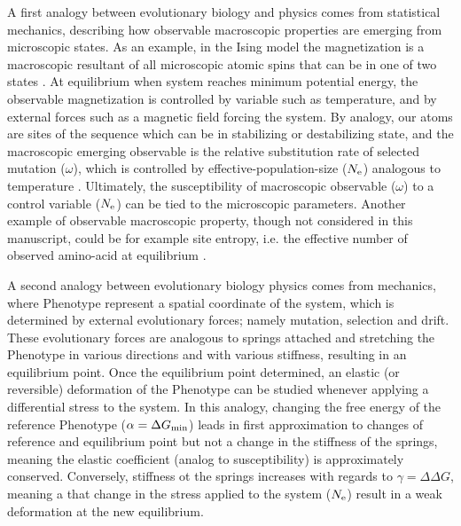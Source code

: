 A first analogy between evolutionary biology and physics comes from statistical mechanics, describing how observable macroscopic properties are emerging from microscopic states.
As an example, in the Ising model the magnetization is a macroscopic resultant of all microscopic atomic spins that can be in one of two states \citep{Brush1967}.
At equilibrium when system reaches minimum potential energy, the observable magnetization is controlled by variable such as temperature, and by external forces such as a magnetic field forcing the system.
By analogy, our atoms are sites of the sequence which can be in stabilizing or destabilizing state, and the macroscopic emerging observable is the relative \gls{substitution} rate of selected mutation ($\omega$), which is controlled by \gls{effective-population-size} ($N_{\mathrm{e}}$) analogous to temperature \cite{Sella2005}.
Ultimately, the susceptibility of macroscopic observable ($\omega$) to a control variable ($N_{\mathrm{e}}$) can be tied to the microscopic parameters.
Another example of observable macroscopic property, though not considered in this manuscript, could be for example site entropy, i.e. the effective number of observed amino-acid at equilibrium \citep{Goldstein2016, Jimenez2018, Jiang2018}. 

A second analogy between evolutionary biology physics comes from mechanics, where \gls{Phenotype} represent a spatial coordinate of the system, which is determined by external evolutionary forces; namely mutation, selection and drift.
These evolutionary forces are analogous to springs attached and stretching the \gls{Phenotype} in various directions and with various stiffness, resulting in an equilibrium point.
Once the equilibrium point determined, an elastic (or reversible) deformation of the \gls{Phenotype} can be studied whenever applying a differential stress to the system.
In this analogy, changing the free energy of the reference \gls{Phenotype} ($\alpha = \Delta G_{\text{min}}$) leads in first approximation to changes of reference and equilibrium point but not a change in the stiffness of the springs, meaning the elastic coefficient (analog to susceptibility) is approximately conserved.
Conversely, stiffness ot the springs increases with regards to $\gamma = \Delta \Delta G$, meaning a that change in the stress applied to the system ($N_{\mathrm{e}}$) result in a weak deformation at the new equilibrium.

